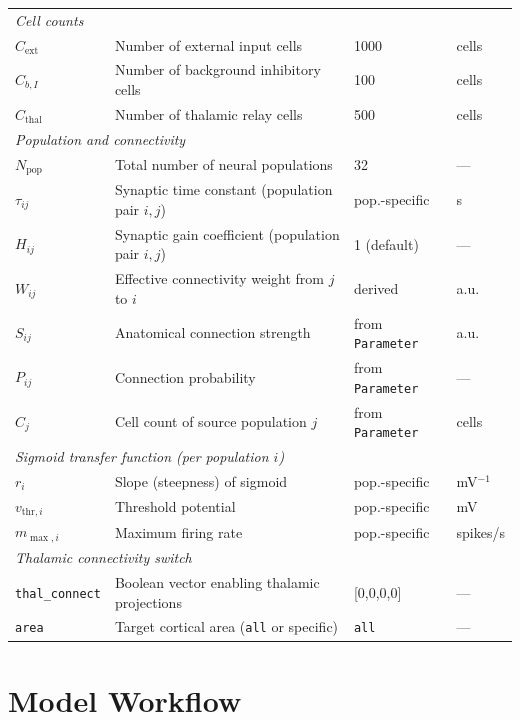 \documentclass[12pt, a4paper]{article}
\begin{document}
\begin{longtable}{@{}lp{5.5cm}p{3.2cm}l@{}}
\multicolumn{4}{l}{\textit{Cell counts}} \\[2pt]
$C_\text{ext}$ & Number of external input cells & 1000 & cells \\
$C_{b,I}$ & Number of background inhibitory cells & 100 & cells \\
$C_\text{thal}$ & Number of thalamic relay cells & 500 & cells \\[6pt]

\multicolumn{4}{l}{\textit{Population and connectivity}} \\[2pt]
$N_\text{pop}$ & Total number of neural populations & 32 & --- \\
$\tau_{ij}$ & Synaptic time constant (population pair $i,j$) & pop.-specific & s \\
$H_{ij}$ & Synaptic gain coefficient (population pair $i,j$) & 1 (default) & --- \\
$W_{ij}$ & Effective connectivity weight from $j$ to $i$ & derived & a.u. \\
$S_{ij}$ & Anatomical connection strength & from \texttt{Parameter} & a.u. \\
$P_{ij}$ & Connection probability & from \texttt{Parameter} & --- \\
$C_j$ & Cell count of source population $j$ & from \texttt{Parameter} & cells \\[6pt]

\multicolumn{4}{l}{\textit{Sigmoid transfer function (per population $i$)}} \\[2pt]
$r_i$ & Slope (steepness) of sigmoid & pop.-specific & mV$^{-1}$ \\
$v_{\text{thr},i}$ & Threshold potential & pop.-specific & mV \\
$m_{\max,i}$ & Maximum firing rate & pop.-specific & spikes/s \\[6pt]

\multicolumn{4}{l}{\textit{Thalamic connectivity switch}} \\[2pt]
\texttt{thal\_connect} & Boolean vector enabling thalamic projections & [0,0,0,0] & --- \\
\texttt{area} & Target cortical area (\texttt{all} or specific) & \texttt{all} & --- \\
\end{longtable}

\section{Model Workflow}
\end{document}
